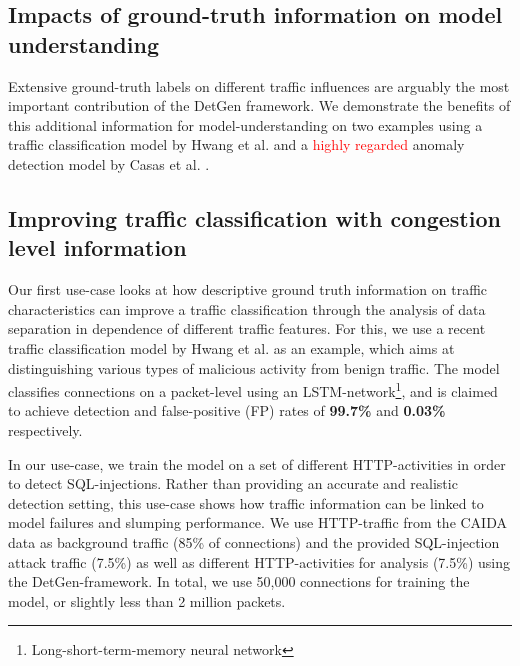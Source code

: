 \documentclass[sigconf]{acmart}
\begin{document}
\subsection{Impacts of ground-truth information on model understanding}

Extensive ground-truth labels on different traffic influences are arguably the most important contribution of the DetGen framework. We demonstrate the benefits of this additional information for model-understanding on two examples using a traffic classification model by Hwang et al. \cite{hwang2019lstm} and a \textcolor{red}{highly regarded} anomaly detection model by Casas et al. \cite{casas2012unsupervised}.

\subsection{Improving traffic classification with congestion level information}
Our first use-case looks at how descriptive ground truth information on traffic characteristics can improve a traffic classification through the analysis of data separation in dependence of different traffic features. For this, we use a recent traffic classification model by Hwang et al. \cite{hwang2019lstm} as an example, which aims at distinguishing various types of malicious activity from benign traffic.
The model classifies connections on a packet-level using an LSTM-network\footnote{Long-short-term-memory neural network}, and is claimed to achieve detection and false-positive (FP) rates of \textbf{99.7\%} and \textbf{0.03\%} respectively. 

In our use-case, we train the model on a set of different HTTP-activities in order to detect SQL-injections. Rather than providing an accurate and realistic detection setting, this use-case shows how traffic information can be linked to model failures and slumping performance. We use HTTP-traffic from the CAIDA data as background traffic (85\% of connections) and the provided SQL-injection attack traffic (7.5\%) as well as different HTTP-activities for analysis (7.5\%) using the DetGen-framework. In total, we use 50,000 connections for training the model, or slightly less than 2 million packets. 
\end{document}
